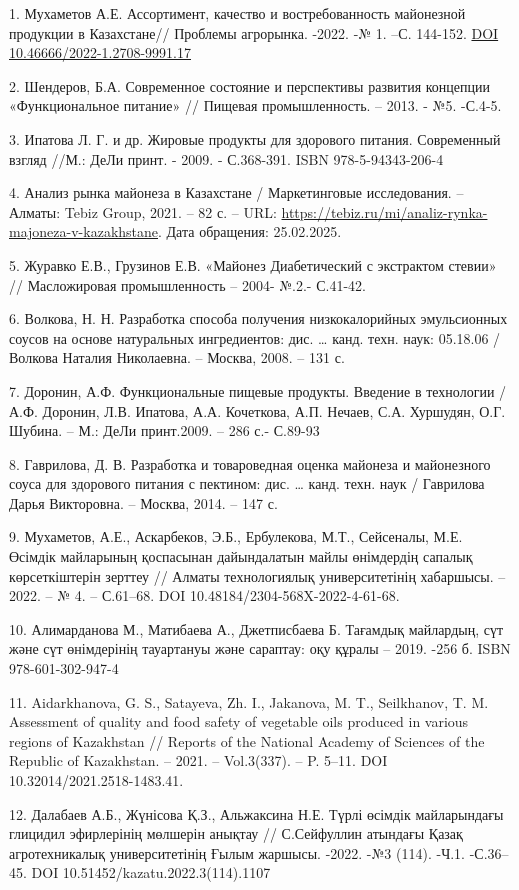 \begin{references}
1. Мухаметов А.Е. Ассортимент, качество и востребованность майонезной
продукции в Казахстане// Проблемы агрорынка. -2022. -№ 1. --С.
144-152. \href{https://doi.org/10.46666/2022-1.2708-9991.17}{DOI
10.46666/2022-1.2708-9991.17}

2. Шендеров, Б.А. Современное состояние и перспективы развития концепции
«Функциональное питание» // Пищевая промышленность. -- 2013. - №5.
-С.4-5.

3. Ипатова Л. Г. и др. Жировые продукты для здорового питания.
Современный взгляд //М.: ДеЛи принт. - 2009. - С.368-391. ISBN
978-5-94343-206-4

4. Анализ рынка майонеза в Казахстане / Маркетинговые исследования. --
Алматы: Tebiz Group, 2021. -- 82 с. -- URL:
\url{https://tebiz.ru/mi/analiz-rynka-majoneza-v-kazakhstane}. Дата
обращения: 25.02.2025.

5. Журавко Е.В., Грузинов Е.В. «Майонез Диабетический с экстрактом
стевии» // Масложировая промышленность -- 2004- №.2.- С.41-42.

6. Волкова, Н. Н. Разработка способа получения низкокалорийных
эмульсионных соусов на основе натуральных ингредиентов: дис. \ldots{}
канд. техн. наук: 05.18.06 / Волкова Наталия Николаевна. -- Москва,
2008. -- 131 с.

7. Доронин, А.Ф. Функциональные пищевые продукты. Введение в технологии /
А.Ф. Доронин, Л.В. Ипатова, А.А. Кочеткова, А.П. Нечаев, С.А. Хуршудян,
О.Г. Шубина. -- М.: ДеЛи принт.2009. -- 286 с.- С.89-93

8. Гаврилова, Д. В. Разработка и товароведная оценка майонеза и
майонезного соуса для здорового питания с пектином: дис. \ldots{}
канд. техн. наук / Гаврилова Дарья Викторовна. -- Москва, 2014. -- 147
с.

9. Мухаметов, А.Е., Аскарбеков, Э.Б., Ербулекова, М.Т., Сейсеналы, М.Е.
Өсімдік майларының қоспасынан дайындалатын майлы өнімдердің сапалық
көрсеткіштерін зерттеу // Алматы технологиялық университетінің
хабаршысы. -- 2022. -- № 4. -- С.61--68. DOI
10.48184/2304-568X-2022-4-61-68.

10. Алимарданова М., Матибаева А., Джетписбаева Б. Тағамдық майлардың, сүт
және сүт өнімдерінің тауартануы және сараптау: оқу құралы -- 2019.
-256 б. ISBN 978-601-302-947-4

11. Aidarkhanova, G. S., Satayeva, Zh. I., Jakanova, M. T., Seilkhanov, T.
M. Assessment of quality and food safety of vegetable oils produced in
various regions of Kazakhstan // Reports of the National Academy of
Sciences of the Republic of Kazakhstan. -- 2021. -- Vol.3(337). -- P.
5--11. DOI 10.32014/2021.2518-1483.41.

12. Далабаев А.Б., Жүнісова Қ.З., Альжаксина Н.Е. Түрлі өсімдік
майларындағы глицидил эфирлерінің мөлшерін анықтау // С.Сейфуллин
атындағы Қазақ агротехникалық университетінің Ғылым жаршысы. -2022.
-№3 (114). -Ч.1. -С.36--45. DOI 10.51452/kazatu.2022.3(114).1107
\end{references}

